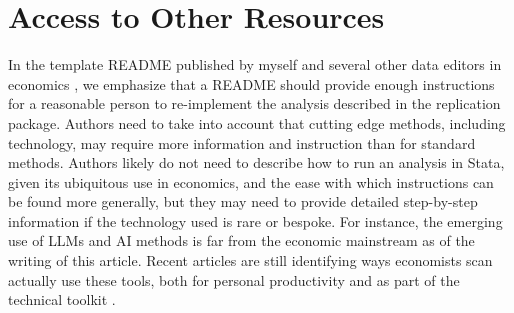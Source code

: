 \documentclass{article}
\begin{document}
%


\section{Access to Other Resources}
\label{sec:other_resources}

In the template README published by myself and several other data editors in economics \parencite{templateREADMEv1.1}, we emphasize that a README should provide enough instructions for a reasonable person to re-implement the analysis described in the replication package. Authors need to take into account that cutting edge methods, including technology, may require more information and instruction than for standard methods. Authors likely do not need to describe how to run an analysis in Stata, given its ubiquitous use in economics, and the ease with which instructions can be found more generally, but they may need to provide detailed step-by-step information if the technology used is rare or bespoke. For instance, the emerging use of \acp{LLM} and \ac{AI} methods is far from the economic mainstream as of the writing of this article. Recent articles are still identifying ways economists scan actually use these tools, both for personal productivity \parencite{korinek_generative_2023} and as part of the technical toolkit \parencite{athey_machine_2019,dell_deep_2024}. 
\end{document}

